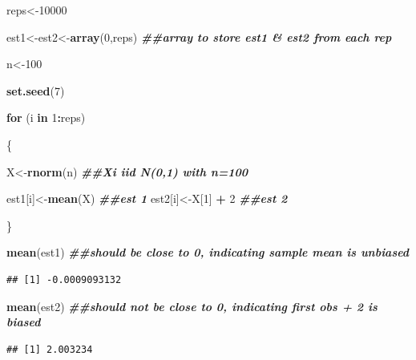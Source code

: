 \documentclass[
]{book}
\newenvironment{Shaded}{\begin{snugshade}}{\end{snugshade}}
\newcommand{\ControlFlowTok}[1]{\textcolor[rgb]{0.13,0.29,0.53}{\textbf{#1}}}
\newcommand{\DecValTok}[1]{\textcolor[rgb]{0.00,0.00,0.81}{#1}}
\newcommand{\DocumentationTok}[1]{\textcolor[rgb]{0.56,0.35,0.01}{\textbf{\textit{#1}}}}
\newcommand{\FunctionTok}[1]{\textcolor[rgb]{0.13,0.29,0.53}{\textbf{#1}}}
\newcommand{\NormalTok}[1]{#1}
\newcommand{\OtherTok}[1]{\textcolor[rgb]{0.56,0.35,0.01}{#1}}
\newcommand{\SpecialCharTok}[1]{\textcolor[rgb]{0.81,0.36,0.00}{\textbf{#1}}}
\begin{document}
\begin{Shaded}
\begin{Highlighting}[]
\NormalTok{reps}\OtherTok{\textless{}{-}}\DecValTok{10000}

\NormalTok{est1}\OtherTok{\textless{}{-}}\NormalTok{est2}\OtherTok{\textless{}{-}}\FunctionTok{array}\NormalTok{(}\DecValTok{0}\NormalTok{,reps) }\DocumentationTok{\#\#array to store est1 \& est2 from each rep}

\NormalTok{n}\OtherTok{\textless{}{-}}\DecValTok{100}

\FunctionTok{set.seed}\NormalTok{(}\DecValTok{7}\NormalTok{)}

\ControlFlowTok{for}\NormalTok{ (i }\ControlFlowTok{in} \DecValTok{1}\SpecialCharTok{:}\NormalTok{reps)}
  
\NormalTok{\{}
  
\NormalTok{  X}\OtherTok{\textless{}{-}}\FunctionTok{rnorm}\NormalTok{(n) }\DocumentationTok{\#\#Xi iid N(0,1) with n=100}
  
\NormalTok{  est1[i]}\OtherTok{\textless{}{-}}\FunctionTok{mean}\NormalTok{(X) }\DocumentationTok{\#\#est 1}
\NormalTok{  est2[i]}\OtherTok{\textless{}{-}}\NormalTok{X[}\DecValTok{1}\NormalTok{] }\SpecialCharTok{+} \DecValTok{2} \DocumentationTok{\#\#est 2}
  
\NormalTok{\}}

\FunctionTok{mean}\NormalTok{(est1) }\DocumentationTok{\#\#should be close to 0, indicating sample mean is unbiased}
\end{Highlighting}
\end{Shaded}

\begin{verbatim}
## [1] -0.0009093132
\end{verbatim}

\begin{Shaded}
\begin{Highlighting}[]
\FunctionTok{mean}\NormalTok{(est2) }\DocumentationTok{\#\#should not be close to 0, indicating first obs + 2 is biased}
\end{Highlighting}
\end{Shaded}

\begin{verbatim}
## [1] 2.003234
\end{verbatim}
\end{document}
